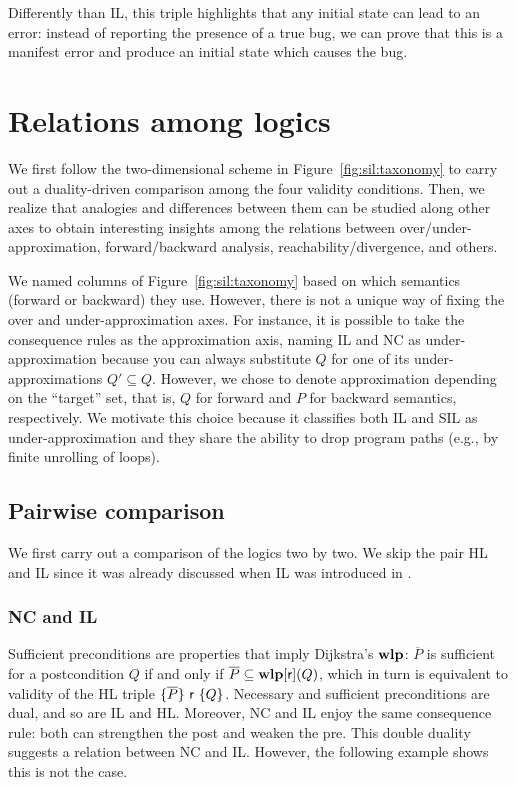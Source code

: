 \begin{example}
	Differently than IL, this triple highlights that any initial state can lead to an error: instead of reporting the presence of a true bug, we can prove that this is a manifest error and produce an initial state which causes the bug.
\end{example}

\section{Relations among logics}\label{sec:sil:comparison}
We first follow the two-dimensional scheme in Figure~\ref{fig:sil:taxonomy} to carry out a duality-driven comparison among the four validity conditions. Then, we realize that analogies and differences between them can be studied along other axes to obtain interesting insights among the relations between over/under-approximation, forward/backward analysis, reachability/divergence, and others.

We named columns of Figure~\ref{fig:sil:taxonomy} based on which semantics (forward or backward) they use. However, there is not a unique way of fixing the over and under-approximation axes. For instance, it is possible to take the consequence rules as the approximation axis, naming IL and NC as under-approximation because you can always substitute $Q$ for one of its under-approximations $Q' \subseteq Q$. However, we chose to denote approximation depending on the ``target'' set, that is, $Q$ for forward and $P$ for backward semantics, respectively. We motivate this choice because it classifies both IL and SIL as under-approximation and they share the ability to drop program paths (e.g., by finite unrolling of loops).

\subsection{Pairwise comparison}
We first carry out a comparison of the logics two by two. We skip the pair HL and IL since it was already discussed when IL was introduced in \cite{OHearn20}.

\subsubsection{NC and IL}
Sufficient preconditions are properties that imply Dijkstra's $\textbf{wlp}$: $\overline{P}$ is sufficient for a postcondition $Q$ if and only if $\overline{P} \subseteq \textbf{wlp}[\mathsf{r}](Q)$, which in turn is equivalent to validity of the HL triple $\{\overline{P}\}~\mathsf{r}~\{Q\}$. Necessary and sufficient preconditions are dual, and so are IL and HL. Moreover, NC and IL enjoy the same consequence rule: both can strengthen the post and weaken the pre. This double duality suggests a relation between NC and IL. However, the following example shows this is not the case.

